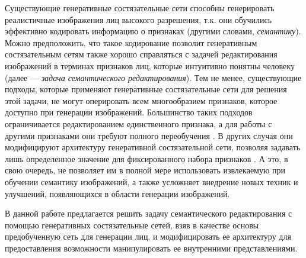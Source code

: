 Существующие генеративные состязательные сети способны генерировать реалистичные изображения лиц высокого разрешения, т.к. они обучились эффективно кодировать информацию о признаках (другими словами, \emph{семантику}). 
Можно предположить, что такое кодирование позволит генеративным состязательным сетям также хорошо справляться с задачей редактирования изображений в терминах признаков лиц, которые интуитивно понятны человеку (далее --- \emph{задача семантического редактирования}). 
Тем не менее, существующие подходы, которые применяют генеративные состязательные сети для решения этой задачи, не могут оперировать всем многообразием признаков, которое доступно при генерации изображений. 
Большинство таких подходов ограничивается редактированием единственного признака, а для работы с другими признаками они требуют полного переобучения \cite{cycle2017gan, residual2017gan}. 
В других случая они  модифицируют  архитектуру генеративной состязательной сети, позволяя задавать лишь определенное значение для фиксированного набора признаков \cite{choi2018stargan, liu2019stgan}. 
А это, в свою очередь, не позволяет им в полной мере использовать извлекаемую при обучении семантику изображений, а также усложняет внедрение новых техник и улучшений, появляющихся в области генерации изображений.

В данной работе предлагается решить задачу семантического редактирования с помощью генеративных состязательные сетей, взяв в качестве основы предобученную сеть для генерации лиц, и модифицировать ее архитектуру для предоставления возможности манипулировать ее внутренними представлениями.

